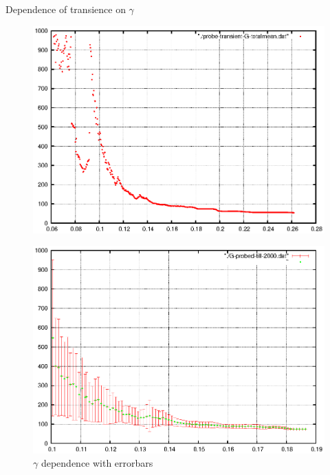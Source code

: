\documentclass[xcolor=x11names,compress]{beamer}
\renewcommand{\(}{\begin{columns}}
\renewcommand{\)}{\end{columns}}
\newcommand{\<}[1]{\begin{column}{#1}}
\renewcommand{\>}{\end{column}}
\begin{document}
\begin{frame}{Dependence of transience on $\gamma$}
\begin{figure}
\begin{center}
\includegraphics[width=0.9\columnwidth]{probeG}
\end{center}
\end{figure}
\end{frame}


\begin{frame}
\begin{figure}
\caption{$\gamma$ dependence with errorbars}%
\begin{center}
\includegraphics[width=0.9\columnwidth]{probeG-t-2000}
\end{center}
\end{figure}
\end{frame}
\end{document}
